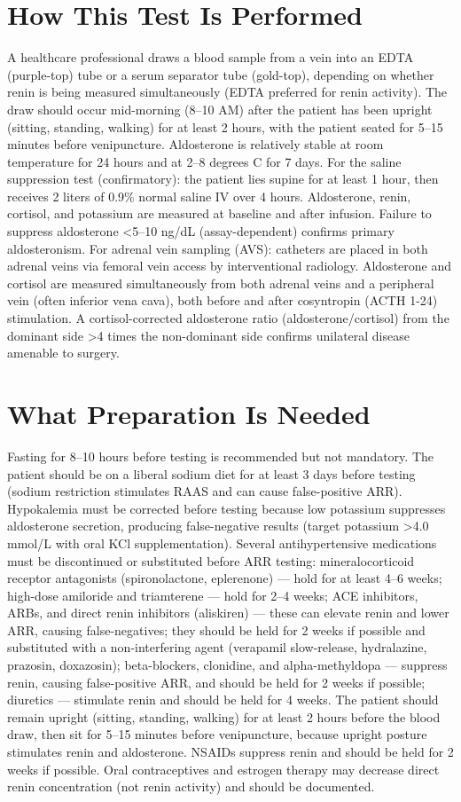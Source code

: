 \section*{How This Test Is Performed}
A healthcare professional draws a blood sample from a vein into an EDTA (purple-top) tube or a serum separator tube (gold-top), depending on whether renin is being measured simultaneously (EDTA preferred for renin activity). The draw should occur mid-morning (8--10 AM) after the patient has been upright (sitting, standing, walking) for at least 2 hours, with the patient seated for 5--15 minutes before venipuncture. Aldosterone is relatively stable at room temperature for 24 hours and at 2--8 degrees C for 7 days. For the saline suppression test (confirmatory): the patient lies supine for at least 1 hour, then receives 2 liters of 0.9\% normal saline IV over 4 hours. Aldosterone, renin, cortisol, and potassium are measured at baseline and after infusion. Failure to suppress aldosterone <5--10 ng/dL (assay-dependent) confirms primary aldosteronism. For adrenal vein sampling (AVS): catheters are placed in both adrenal veins via femoral vein access by interventional radiology. Aldosterone and cortisol are measured simultaneously from both adrenal veins and a peripheral vein (often inferior vena cava), both before and after cosyntropin (ACTH 1-24) stimulation. A cortisol-corrected aldosterone ratio (aldosterone/cortisol) from the dominant side >4 times the non-dominant side confirms unilateral disease amenable to surgery.

\section*{What Preparation Is Needed}
Fasting for 8--10 hours before testing is recommended but not mandatory. The patient should be on a liberal sodium diet for at least 3 days before testing (sodium restriction stimulates RAAS and can cause false-positive ARR). Hypokalemia must be corrected before testing because low potassium suppresses aldosterone secretion, producing false-negative results (target potassium >4.0 mmol/L with oral KCl supplementation). Several antihypertensive medications must be discontinued or substituted before ARR testing: mineralocorticoid receptor antagonists (spironolactone, eplerenone) --- hold for at least 4--6 weeks; high-dose amiloride and triamterene --- hold for 2--4 weeks; ACE inhibitors, ARBs, and direct renin inhibitors (aliskiren) --- these can elevate renin and lower ARR, causing false-negatives; they should be held for 2 weeks if possible and substituted with a non-interfering agent (verapamil slow-release, hydralazine, prazosin, doxazosin); beta-blockers, clonidine, and alpha-methyldopa --- suppress renin, causing false-positive ARR, and should be held for 2 weeks if possible; diuretics --- stimulate renin and should be held for 4 weeks. The patient should remain upright (sitting, standing, walking) for at least 2 hours before the blood draw, then sit for 5--15 minutes before venipuncture, because upright posture stimulates renin and aldosterone. NSAIDs suppress renin and should be held for 2 weeks if possible. Oral contraceptives and estrogen therapy may decrease direct renin concentration (not renin activity) and should be documented.

